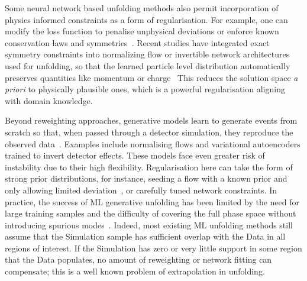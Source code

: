 {{        Some neural network based unfolding methods also permit incorporation of physics informed constraints as a form of regularisation.
        For example, one can modify the loss function to penalise unphysical deviations or enforce known conservation laws and symmetries~\cite{cui_knowledge-augmented_2022, hepmllivingreview, howard_advancing_2022, lagrave_equivariant_2022, pazos_towards_2024, unke_machine_2021, dopp_data-driven_2023, rieger_rwth}.
        Recent studies have integrated exact symmetry constraints into normalizing flow or invertible network architectures used for unfolding, so that the learned particle level distribution automatically preserves quantities like momentum or charge~\cite{Bellagente2020InvertibleAgain, Ackerschott2023ReturningBelong}
        This reduces the solution space \textit{a priori} to physically plausible ones, which is a powerful regularisation aligning with domain knowledge.

        Beyond reweighting approaches, generative models learn to generate events from scratch so that, when passed through a detector simulation, they reproduce the observed data~\cite{datta_unfolding_2018, Butter2020GANplifyingSamples}.
        Examples include normalising flows and variational autoencoders trained to invert detector effects.
        These models face even greater risk of instability due to their high flexibility.
        Regularisation here can take the form of strong prior distributions, for instance, seeding a flow with a known prior and only allowing limited deviation~\cite{Humble:2022vtm, Huetsch2024TheLearning}, or carefully tuned network constraints.
        In practice, the success of ML generative unfolding has been limited by the need for large training samples and the difficulty of covering the full phase space without introducing spurious modes~\cite{Huetsch2024TheLearning, Canelli:2025ybb}.
        Indeed, most existing ML unfolding methods still assume that the Simulation sample has sufficient overlap with the Data in all regions of interest.
        If the Simulation has zero or very little support in some region that the Data populates, no amount of reweighting or network fitting can compensate; this is a well known problem of extrapolation in unfolding.

}}
